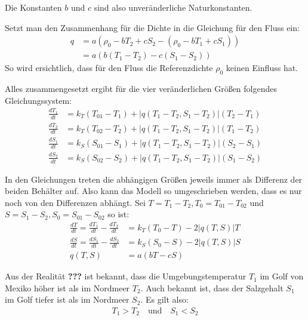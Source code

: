 \documentclass[a4paper,twoside]{article}
\begin{document}
	Die Konstanten \(b\) und \(c\) sind also unveränderliche Naturkonstanten.
	
	Setzt man den Zusammenhang für die Dichte in die Gleichung für den Fluss ein:
	\begin{align*}
		q &= a \left( \rho_0 - bT_2 + cS_2 - \left( \rho_0 - bT_1 + cS_1 \right) \right) \\
		&= a \left( b\left( T_1 - T_2 \right) - c \left( S_1 - S_2 \right) \right)
	\end{align*}
	So wird ersichtlich, dass für den Fluss die Referenzdichte \(\rho_0\) keinen Einfluss hat.
	
	Alles zusammengesetzt ergibt für die vier veränderlichen Größen folgendes Gleichungssystem:
	\begin{align*}
		\frac{dT_1}{dt} &= k_T\left(T_{01} - T_1\right) + \left|q(T_1 - T_2,S_1 - T_2)\right|\left(T_2 - T_1\right) \\
		\frac{dT_2}{dt} &= k_T\left(T_{02} - T_2\right) + \left|q(T_1 - T_2,S_1 - T_2)\right|\left(T_1 - T_2\right) \\
		\frac{dS_1}{dt} &= k_S\left(S_{01} - S_1\right) + \left|q(T_1 - T_2,S_1 - T_2)\right|\left(S_2 - S_1\right) \\
		\frac{dS_2}{dt} &= k_S\left(S_{02} - S_2\right) + \left|q(T_1 - T_2,S_1 - T_2)\right|\left(S_1 - S_2\right)
	\end{align*}
	 
	 In den Gleichungen treten die abhängigen Größen jeweils immer als Differenz der beiden Behälter auf. Also kann das Modell so umgeschrieben werden, dass es nur noch von den Differenzen abhängt. Sei \(T = T_1 - T_2, T_0 = T_{01} - T_{02}\) und \(S = S_1 - S_2, S_0 = S_{01} - S_{02}\)  so ist:
	 \begin{align*}
	 	\frac{dT}{dt} = \frac{dT_1}{dt} - \frac{dT_2}{dt} &= k_T\left(T_{0} - T\right) - 2\left|q(T,S)\right|T \\
	 	\frac{dS}{dt} = \frac{dS_1}{dt} - \frac{dS_2}{dt} &= k_S\left(S_{0} - S\right) - 2\left|q(T,S)\right|S \\
	 	q(T,S) &= a\left(bT - cS\right)
	 \end{align*}
	  
	Aus der Realität \textbf{???} ist bekannt, dass die Umgebungstemperatur \(T_1\) im Golf von Mexiko höher ist als im Nordmeer \(T_2\). Auch bekannt ist, dass der Salzgehalt \(S_1\) im Golf tiefer ist als im Nordmeer \(S_2\). Es gilt also:
	\begin{align*}
		T_1 > T_2 \quad \textrm{und} \quad S_1 < S_2
	\end{align*}
	
\end{document}
